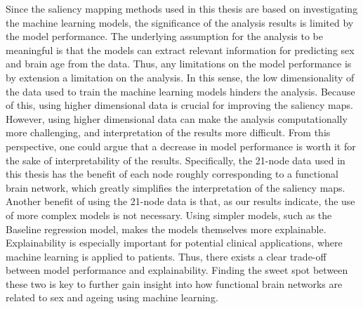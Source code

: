 Since the saliency mapping methods used in this thesis are based on investigating the machine learning models, the significance of the analysis results is limited by the model performance. The underlying assumption for the analysis to be meaningful is that the models can extract relevant information for predicting sex and brain age from the data. Thus, any limitations on the model performance is by extension a limitation on the analysis. In this sense, the low dimensionality of the data used to train the machine learning models hinders the analysis. Because of this, using higher dimensional data is crucial for improving the saliency maps. However, using higher dimensional data can make the analysis computationally more challenging, and interpretation of the results more difficult. From this perspective, one could argue that a decrease in model performance is worth it for the sake of interpretability of the results. Specifically, the 21-node data used in this thesis has the benefit of each node roughly corresponding to a functional brain network, which greatly simplifies the interpretation of the saliency maps. Another benefit of using the 21-node data is that, as our results indicate, the use of more complex models is not necessary. Using simpler models, such as the Baseline regression model, makes the models themselves more explainable. Explainability is especially important for potential clinical applications, where machine learning is applied to patients. Thus, there exists a clear trade-off between model performance and explainability. Finding the sweet spot between these two is key to further gain insight into how functional brain networks are related to sex and ageing using machine learning. 
